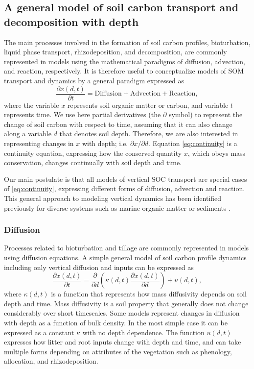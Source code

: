 \documentclass[11pt, oneside, a4paper]{article}   	%
\begin{document}
\subsection{A general model of soil carbon transport and decomposition with depth}
The main processes involved in the formation of soil carbon profiles, bioturbation, liquid phase transport, rhizodeposition, and decomposition, are commonly represented in models using the mathematical paradigms of diffusion, advection, and reaction, respectively.
It is therefore useful to conceptualize models of SOM transport and dynamics by a general paradigm expressed as
\begin{equation} \label{eq:continuity}
\frac{\partial x(d, t)}{\partial t} = \mathrm{Diffusion} + \mathrm{Advection} + \mathrm{Reaction},
\end{equation}
where the variable $x$ represents soil organic matter or carbon, and variable $t$ represents time. We use here partial derivatives (the $\partial$ symbol) to represent the change of soil carbon with respect to time, assuming that it can also change along a variable $d$ that denotes soil depth. Therefore, we are also interested in representing changes in $x$ with depth; i.e. $\partial x/\partial d$. Equation \ref{eq:continuity} is a continuity equation, expressing how the conserved quantity $x$, which obeys mass conservation, changes continually with soil depth and time. 

Our main postulate is that all models of vertical SOC transport are special cases of \ref{eq:continuity}, expressing different forms of diffusion, advection and reaction. This general approach to modeling vertical dynamics has been identified previously for diverse systems such as marine organic matter \citep{Sarmiento2006} or sediments \citep{Arndt2013}.

\subsubsection{Diffusion}
Processes related to bioturbation and tillage are commonly represented in models using diffusion equations. 
A simple general model of soil carbon profile dynamics including only vertical diffusion and inputs can be expressed as
\begin{equation} \label{eq:diffusion}
\frac{\partial x(d,t)}{\partial t} = \frac{\partial}{\partial d} \left( \kappa(d, t) \frac{\partial x(d, t)}{\partial d} \right) + u (d, t),
\end{equation}
where $\kappa(d, t)$ is a function that represents how mass diffusivity depends on soil depth and time. Mass diffusivity is a soil property that generally does not change considerably over short timescales. Some models represent changes in diffusion with depth as a function of bulk density. In the most simple case it can be expressed as a constant $\kappa$ with no depth dependence. The function $u(d, t)$ expresses how litter and root inputs change with depth and time, and can take multiple forms depending on attributes of the vegetation such as phenology, allocation, and rhizodeposition. 
\end{document}
